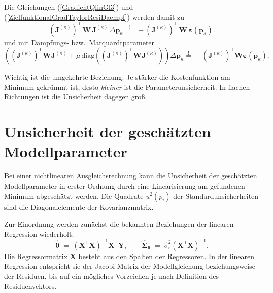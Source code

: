 Die Gleichungen (\ref{GradientQlinGl3}) und (\ref{ZielfunktionalGradTaylorResiDaempf})
werden damit zu
\begin{equation}
\left(\boldsymbol{J}^{(\kappa)}\right)^\mathsf{T} \, \mathbf{W} \,
\boldsymbol{J}^{(\kappa)} \, \Delta \mathbf{p}_\kappa
\; \overset{!}{=} \;
-  \left(\boldsymbol{J}^{(\kappa)}\right)^\mathsf{T} \, \mathbf{W} \,
\boldsymbol{\varepsilon}(\mathbf{p}_\kappa) .
\label{GradientQlinGl3W}
\end{equation}
und mit Dämpfungs- bzw.\ Marquardtparameter
\begin{equation}
\left(
\left(\boldsymbol{J}^{(\kappa)}\right)^\mathsf{T} \mathbf{W}
\boldsymbol{J}^{(\kappa)}
 + \mu\,\mathrm{diag}\!\left(\left(\boldsymbol{J}^{(\kappa)}\right)^\mathsf{T}
\mathbf{W}\boldsymbol{J}^{(\kappa)}\right)\right)\Delta\mathbf p_\kappa
\overset{!}{=}
-\left(\boldsymbol{J}^{(\kappa)}\right)^\mathsf{T}\mathbf W
\boldsymbol\varepsilon(\mathbf p_\kappa).
\label{ZielfunktionalGradTaylorResiDaempfW}
\end{equation}

Wichtig ist die umgekehrte Beziehung: Je stärker die Kostenfunktion am Minimum gekrümmt ist, desto \emph{kleiner} ist die Parameterunsicherheit. In flachen Richtungen ist die Unsicherheit dagegen groß.

\section{\label{sec:UnsicherheitNichtlinParameter}
Unsicherheit der geschätzten Modellparameter}

Bei einer nichtlinearen Ausgleichsrechnung kann die Unsicherheit der geschätzten
Modellparameter in erster Ordnung durch eine Linearisierung am gefundenen
Minimum abgeschätzt werden. Die Quadrate $u^2(p_i)$ der
Standardunsicherheiten sind die Diagonalelemente der Kovarianzmatrix.

Zur Einordnung werden zunächst die bekannten Beziehungen der linearen
Regression wiederholt:
\begin{equation*}
\boldsymbol{\hat \theta} \; = \;
\left( \mathbf{X}^\mathsf{T} \mathbf{X} \right)^{-1}
\mathbf{X}^\mathsf{T} \mathbf{Y},
\qquad
\boldsymbol{\hat \Sigma}_{\boldsymbol{\theta}} \; = \;
\hat \sigma_{\varepsilon}^2
\left( \mathbf{X}^\mathsf{T} \mathbf{X} \right)^{-1}.
\end{equation*}
Die Regressormatrix $\mathbf{X}$ besteht aus den Spalten der Regressoren. In der
linearen Regression entspricht sie der Jacobi-Matrix der Modellgleichung
beziehungsweise der Residuen, bis auf ein mögliches Vorzeichen je nach Definition
des Residuenvektors.

